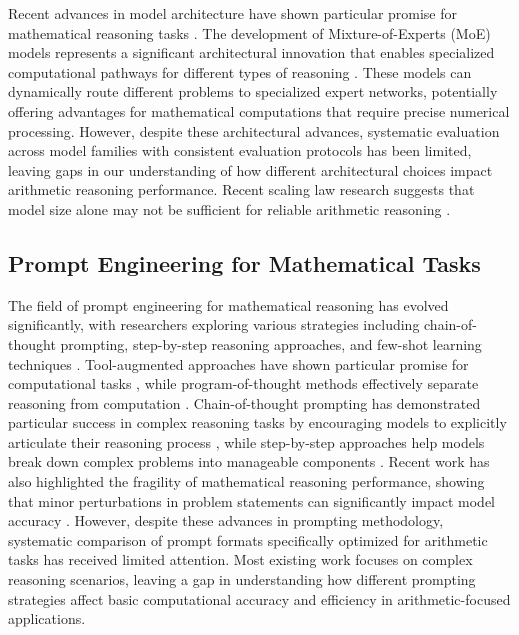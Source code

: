 \documentclass{article}
\begin{document}
Recent advances in model architecture have shown particular promise for mathematical reasoning tasks \citep{gou2024tora, bi2024deepseekmath, shao2024internlm_math}. The development of Mixture-of-Experts (MoE) models represents a significant architectural innovation that enables specialized computational pathways for different types of reasoning \citep{fedus2022switch_transformer}. These models can dynamically route different problems to specialized expert networks, potentially offering advantages for mathematical computations that require precise numerical processing. However, despite these architectural advances, systematic evaluation across model families with consistent evaluation protocols has been limited, leaving gaps in our understanding of how different architectural choices impact arithmetic reasoning performance. Recent scaling law research suggests that model size alone may not be sufficient for reliable arithmetic reasoning \citep{kaplan2020scaling}.

\subsection{Prompt Engineering for Mathematical Tasks}

The field of prompt engineering for mathematical reasoning has evolved significantly, with researchers exploring various strategies including chain-of-thought prompting, step-by-step reasoning approaches, and few-shot learning techniques \citep{wei2022chain_of_thought, wang2022self_consistency}. Tool-augmented approaches have shown particular promise for computational tasks \citep{mishra2024mathsensei}, while program-of-thought methods effectively separate reasoning from computation \citep{chen2023pot}. Chain-of-thought prompting has demonstrated particular success in complex reasoning tasks by encouraging models to explicitly articulate their reasoning process \citep{openai2024learning_reason}, while step-by-step approaches help models break down complex problems into manageable components \citep{yue2024mammoth}. Recent work has also highlighted the fragility of mathematical reasoning performance, showing that minor perturbations in problem statements can significantly impact model accuracy \citep{mirzadeh2024gsm_symbolic}. However, despite these advances in prompting methodology, systematic comparison of prompt formats specifically optimized for arithmetic tasks has received limited attention. Most existing work focuses on complex reasoning scenarios, leaving a gap in understanding how different prompting strategies affect basic computational accuracy and efficiency in arithmetic-focused applications.
\end{document}
